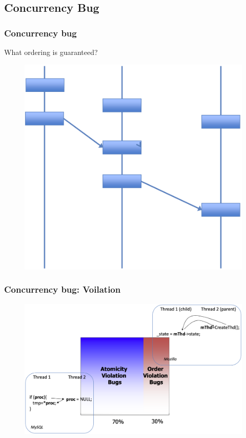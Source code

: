 \subsection{Concurrency Bug} %
\begin{frame}[fragile]
    \frametitle{Concurrency bug}

What ordering is guaranteed?

    \begin{figure}
    \includegraphics[width=0.45\linewidth]{figs/ordering.png}
    \end{figure}
\end{frame}
% 
% 
% 
% 
% 
% 
\begin{frame}[fragile]
    \frametitle{Concurrency bug: Voilation}
    \begin{figure}
    \includegraphics[width=0.75\linewidth]{figs/root-cause-patterns-violation.png}
    \end{figure}
\end{frame}
